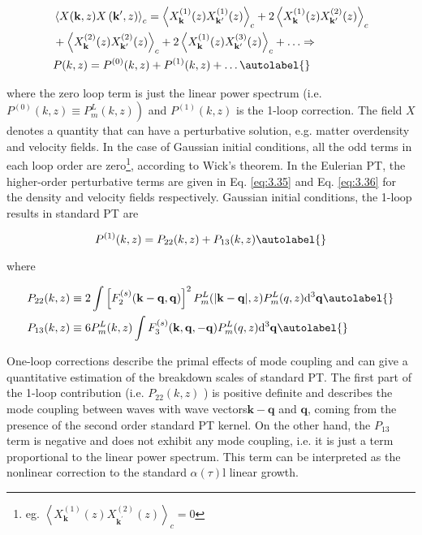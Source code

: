 \begin{align*}
    & \left\langle X(\mathbf{k}, z) X\left(\mathbf{k}^{\prime}, z\right)\right\rangle_{c}=\left\langle X_{\mathbf{k}}^{(1)}(z) X_{\mathbf{k}^{\prime}}^{(1)}(z)\right\rangle_{c}+2\left\langle X_{\mathbf{k}}^{(1)}(z) X_{\mathbf{k}^{\prime}}^{(2)}(z)\right\rangle_{c} \\
    & +\left\langle X_{\mathbf{k}}^{(2)}(z) X_{\mathbf{k}^{\prime}}^{(2)}(z)\right\rangle_{c}+2\left\langle X_{\mathbf{k}}^{(1)}(z) X_{\mathbf{k}^{\prime}}^{(3)}(z)\right\rangle_{c}+\ldots \Rightarrow \\
    & P(k, z)=P^{(0)}(k, z)+P^{(1)}(k, z)+\ldots \autolabel{}
\end{align*}


where the zero loop term is just the linear power spectrum (i.e. $\left.P^{(0)}(k, z) \equiv P_{m}^{L}(k, z)\right)$ and $P^{(1)}(k, z)$ is the 1-loop correction. The field $X$ denotes a quantity that can have a perturbative solution, e.g. matter overdensity and velocity fields. 
In the case of Gaussian initial conditions, all the odd terms in each loop order are zero\footnote{eg. $ \left\langle X_{\mathbf{k}}^{(1)}(z) X_{\mathbf{k}^{\prime}}^{(2)}(z)\right\rangle_{c} = 0$}, according to Wick's theorem. In the Eulerian PT, the higher-order perturbative terms are given in Eq. \ref{eq:3.35} and Eq. \ref{eq:3.36} for the density and velocity fields respectively. 
Gaussian initial conditions, the 1-loop results in standard PT are \cite{Bernardeau_2002}


\begin{equation}
P^{(1)}(k, z)=P_{22}(k, z)+P_{13}(k, z) \autolabel{}
\end{equation}


where


\begin{align}
    & P_{22}(k, z) \equiv 2 \int\left[F_{2}^{(s)}(\mathbf{k}-\mathbf{q}, \mathbf{q})\right]^{2} P_{m}^{L}(|\mathbf{k}-\mathbf{q}|, z) P_{m}^{L}(q, z) \mathrm{d}^{3} \mathbf{q}  \autolabel{}\\
    & P_{13}(k, z) \equiv 6 P_{m}^{L}(k, z) \int F_{3}^{(s)}(\mathbf{k}, \mathbf{q},-\mathbf{q}) P_{m}^{L}(q, z) \mathrm{d}^{3} \mathbf{q} \autolabel{}
\end{align}


One-loop corrections describe the primal effects of mode coupling and can give a quantitative estimation of the breakdown scales of standard PT. The first part of the 1-loop contribution (i.e. $P_{22}(k, z)$ ) is positive definite and describes the mode coupling between waves with wave vectors$\mathbf{k}-\mathbf{q}$ and $\mathbf{q}$, coming from the presence of the second order standard PT kernel. On the other hand, the $P_{13}$ term is negative and does not exhibit any mode coupling, i.e. it is just a term proportional to the linear power spectrum. This term can be interpreted as the nonlinear correction to the standard $\alpha(\tau)$l linear growth.\\


